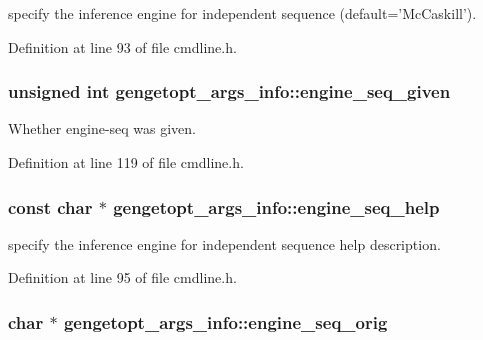 specify the inference engine for independent sequence (default='Mc\+Caskill'). 



Definition at line 93 of file cmdline.\+h.

\hypertarget{structgengetopt__args__info_ab3cefd9fb1ccec8f27e55a6ab1c9acfb}{
\subsubsection[{engine\+\_\+seq\+\_\+given}]{\setlength{\rightskip}{0pt plus 5cm}unsigned int gengetopt\+\_\+args\+\_\+info\+::engine\+\_\+seq\+\_\+given}}\label{structgengetopt__args__info_ab3cefd9fb1ccec8f27e55a6ab1c9acfb}


Whether engine-\/seq was given. 



Definition at line 119 of file cmdline.\+h.

\hypertarget{structgengetopt__args__info_a49e17a823ee81349a2a9ae841c4efa37}{
\subsubsection[{engine\+\_\+seq\+\_\+help}]{\setlength{\rightskip}{0pt plus 5cm}const char $\ast$ gengetopt\+\_\+args\+\_\+info\+::engine\+\_\+seq\+\_\+help}}\label{structgengetopt__args__info_a49e17a823ee81349a2a9ae841c4efa37}


specify the inference engine for independent sequence help description. 



Definition at line 95 of file cmdline.\+h.

\hypertarget{structgengetopt__args__info_abe98c49189906e22b3050266037b7a60}{
\subsubsection[{engine\+\_\+seq\+\_\+orig}]{\setlength{\rightskip}{0pt plus 5cm}char $\ast$ gengetopt\+\_\+args\+\_\+info\+::engine\+\_\+seq\+\_\+orig}}\label{structgengetopt__args__info_abe98c49189906e22b3050266037b7a60}


